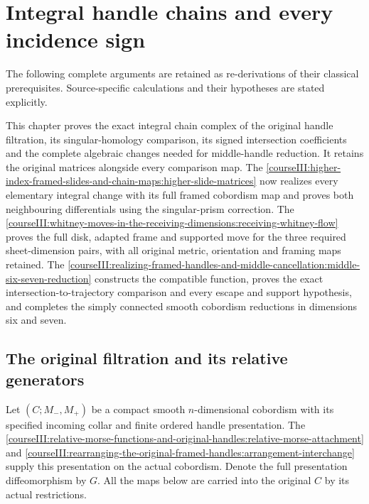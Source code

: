 \section{Integral handle chains and every incidence sign}\label{courseIII:integral-handle-chains-and-signed-incidences:section}

The following complete arguments are retained as re-derivations of their classical prerequisites. Source-specific calculations and their hypotheses are stated explicitly.

This chapter proves the exact integral chain complex of the original handle filtration, its singular-homology comparison, its signed intersection coefficients and the complete algebraic changes needed for middle-handle reduction. It retains the original matrices alongside every comparison map. The \cref{courseIII:higher-index-framed-slides-and-chain-maps:higher-slide-matrices} now realizes every elementary integral change with its full framed cobordism map and proves both neighbouring differentials using the singular-prism correction. The \cref{courseIII:whitney-moves-in-the-receiving-dimensions:receiving-whitney-flow} proves the full disk, adapted frame and supported move for the three required sheet-dimension pairs, with all original metric, orientation and framing maps retained. The \cref{courseIII:realizing-framed-handles-and-middle-cancellation:middle-six-seven-reduction} constructs the compatible function, proves the exact intersection-to-trajectory comparison and every escape and support hypothesis, and completes the simply connected smooth cobordism reductions in dimensions six and seven.

\subsection{The original filtration and its relative generators}
\label{courseIII:integral-handle-chains-and-signed-incidences:handle-filtration}

\label{courseIII:integral-handle-chains-and-signed-incidences:section-1}\label{courseIII:handle-chains:1}

Let \((C;M_-,M_+)\) be a compact smooth \(n\)-dimensional cobordism with its specified incoming collar and finite ordered handle presentation. The \cref{courseIII:relative-morse-functions-and-original-handles:relative-morse-attachment} and \cref{courseIII:rearranging-the-original-framed-handles:arrangement-interchange} supply this presentation on the actual cobordism. Denote the full presentation diffeomorphism by \(G\). All the maps below are carried into the original \(C\) by its actual restrictions.

